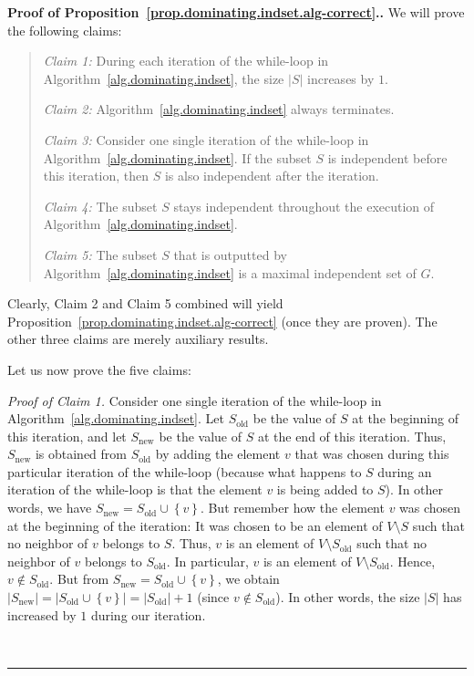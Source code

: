 \documentclass[numbers=enddot,12pt,final,onecolumn,notitlepage]{scrartcl}%
\theoremstyle{definition}
\newenvironment{statement}{\begin{quote}}{\end{quote}}
\newenvironment{proof}[1][Proof]{\noindent\textbf{#1.} }{\ \rule{0.5em}{0.5em}}
\newcommand{\set}[1]{\left\{ #1 \right\}}
\newcommand{\abs}[1]{\left| #1 \right|}
\begin{document}
\begin{proof}[Proof of
Proposition~\ref{prop.dominating.indset.alg-correct}.]
We will prove the following claims:

\begin{statement}
\textit{Claim 1:} During each iteration of the while-loop in
Algorithm~\ref{alg.dominating.indset}, the size $\abs{S}$ increases
by $1$.

\textit{Claim 2:} Algorithm~\ref{alg.dominating.indset} always
terminates.

\textit{Claim 3:} Consider one single iteration of the while-loop
in Algorithm~\ref{alg.dominating.indset}. If the subset $S$ is
independent before this iteration, then $S$ is also independent after
the iteration.

\textit{Claim 4:} The subset $S$ stays independent throughout
the execution of Algorithm~\ref{alg.dominating.indset}.

\textit{Claim 5:} The subset $S$ that is outputted by
Algorithm~\ref{alg.dominating.indset}
is a maximal independent set of $G$.
\end{statement}

Clearly, Claim 2 and Claim 5 combined will yield
Proposition~\ref{prop.dominating.indset.alg-correct} (once they are
proven). The other three claims are merely auxiliary results.

Let us now prove the five claims:

\textit{Proof of Claim 1.} Consider one
single iteration of the while-loop in
Algorithm~\ref{alg.dominating.indset}. Let $S_{\operatorname{old}}$ be
the value of $S$ at the beginning of this iteration, and let
$S_{\operatorname{new}}$ be the value of $S$ at the end of this
iteration. Thus, $S_{\operatorname{new}}$ is obtained from
$S_{\operatorname{old}}$ by adding the element $v$ that was chosen
during this particular iteration of the while-loop (because what
happens to $S$ during an iteration of the while-loop is that the
element $v$ is being added to $S$). In other words, we have
$S_{\operatorname{new}} = S_{\operatorname{old}} \cup \set{v}$.
But remember how the element $v$ was chosen at the beginning of the
iteration: It was chosen to be an element of $V \setminus S$ such that
no neighbor of $v$ belongs to $S$. Thus, $v$ is an element of
$V \setminus S_{\operatorname{old}}$ such that no neighbor of $v$
belongs to $S_{\operatorname{old}}$. In particular, $v$ is an element
of $V \setminus S_{\operatorname{old}}$. Hence,
$v \notin S_{\operatorname{old}}$. But from
$S_{\operatorname{new}} = S_{\operatorname{old}} \cup \set{v}$, we
obtain
$\abs{S_{\operatorname{new}}}
= \abs{S_{\operatorname{old}} \cup \set{v}}
= \abs{S_{\operatorname{old}}} + 1$ (since
$v \notin S_{\operatorname{old}}$). In other words, the size $\abs{S}$
has increased by $1$ during our iteration.


\end{proof}
\end{document}
